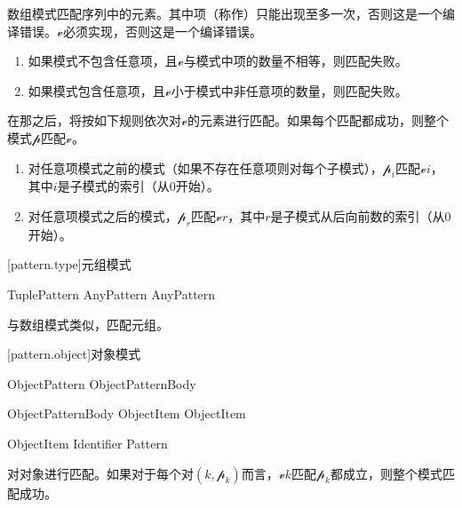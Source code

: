 \pnum
数组模式匹配序列中的元素。其中项（称作）只能出现至多一次，否则这是一个编译错误。$\mathcal{v}$必须实现，否则这是一个编译错误。

\begin{enumerate}
    \item 如果模式不包含任意项，且$\mathcal{v}$与模式中项的数量不相等，则匹配失败。
    \item 如果模式包含任意项，且$\mathcal{v}$小于模式中非任意项的数量，则匹配失败。
\end{enumerate}

\pnum
在那之后，将按如下规则依次对$\mathcal{v}$的元素进行匹配。如果每个匹配都成功，则整个模式$\mathcal{p}$匹配$\mathcal{v}$。

\begin{enumerate}
    \item 对任意项模式之前的模式（如果不存在任意项则对每个子模式），$\mathcal{p}_i$匹配$\mathcal{v}$\tcode{[}$i$\tcode{]}，其中$i$是子模式的索引（从0开始）。
    \item 对任意项模式之后的模式，$\mathcal{p}_r$匹配$\mathcal{v}$\tcode{[\$-}$r$\tcode{]}，其中$r$是子模式从后向前数的索引（从0开始）。
\end{enumerate}

[pattern.type]{元组模式}

\begin{bnf}{TuplePattern}
    \terminal{(} AnyPattern \bnflp\terminal{,} AnyPattern\bnfrp\bnfs\ \terminal{)}
\end{bnf}

\pnum
与数组模式类似，匹配元组。

[pattern.object]{对象模式}

\begin{bnf}{ObjectPattern}
    \terminal{\{} ObjectPatternBody \terminal{\}}
\end{bnf}

\begin{bnf}{ObjectPatternBody}
    ObjectItem \bnflp\terminal{,} ObjectItem\bnfrp\bnfs
\end{bnf}

\begin{bnf}{ObjectItem}
    Identifier \terminal{:} Pattern
\end{bnf}

\pnum
{}对对象进行匹配。如果对于每个对$(k, \mathcal{p}_k)$而言，$\mathcal{v}$$k$匹配$\mathcal{p}_k$都成立，则整个模式匹配成功。

